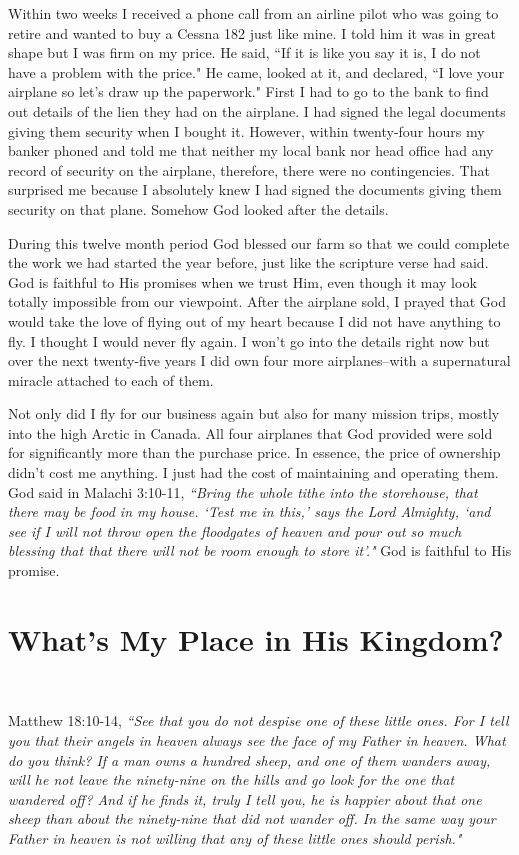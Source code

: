 \documentclass[oneside]{book}
\begin{document}
Within two weeks I received a phone call from an airline pilot who was going to retire and wanted to buy a Cessna 182 just like mine. I told him it was in great shape but I was firm on my price. He said, ``If it is like you say it is, I do not have a problem with the price." He came, looked at it, and declared, ``I love your airplane so let's draw up the paperwork." First I had to go to the bank to find out details of the lien they had on the airplane. I had signed the legal documents giving them security when I bought it. However, within twenty-four hours my banker phoned and told me that neither my local bank nor head office had any record of security on the airplane, therefore, there were no contingencies. That surprised me because I absolutely knew I had signed the documents giving them security on that plane. Somehow God looked after the details.

During this twelve month period God blessed our farm so that we could complete the work we had started the year before, just like the scripture verse had said. God is faithful to His promises when we trust Him, even though it may look totally impossible from our viewpoint. After the airplane sold, I prayed that God would take the love of flying out of my heart because I did not have anything to fly. I thought I would never fly again. I won't go into the details right now but over the next twenty-five years I did own four more airplanes--with a supernatural miracle attached to each of them. 

Not only did I fly for our business again but also for many mission trips, mostly into the high Arctic in Canada. All four airplanes that God provided were sold for significantly more than the purchase price. In essence, the price of ownership didn't cost me anything. I just had the cost of maintaining and operating them. God said in Malachi 3:10-11, \textit{``Bring the whole tithe into the storehouse, that there may be food in my house. `Test me in this,' says the Lord Almighty, `and see if I will not throw open the floodgates of heaven and pour out so much blessing that that there will not be room enough to store it'."} God is faithful to His promise.


\chapter{What's My Place in His Kingdom?}
\

Matthew 18:10-14, \textit{``See that you do not despise one of these little ones. For I tell you that their angels in heaven always see the face of my Father in heaven. What do you think? If a man owns a hundred sheep, and one of them wanders away, will he not leave the ninety-nine on the hills and go look for the one that wandered off? And if he finds it, truly I tell you, he is happier about that one sheep than about the ninety-nine that did not wander off. In the same way your Father in heaven is not willing that any of these little ones should perish."}
\end{document}
